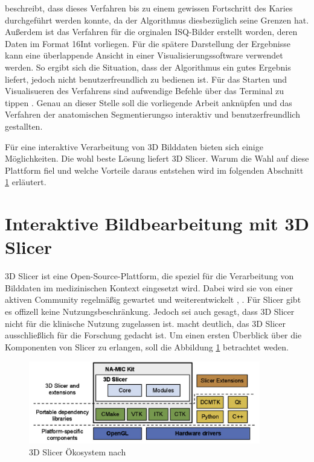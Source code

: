 \citet[S.~55]{hoffmann2020} beschreibt, dass dieses Verfahren bis zu einem
gewissen Fortschritt des Karies durchgeführt werden konnte, da der Algorithmus diesbezüglich
seine Grenzen hat. Außerdem ist das Verfahren für die orginalen \ac{ISQ}-Bilder erstellt
worden, deren Daten im Format \ac{16Int} vorliegen. Für die spätere Darstellung
der Ergebnisse kann eine überlappende Ansicht in einer Visualisierungssoftware
verwendet werden. So ergibt sich die Situation, dass der Algorithmus ein gutes
Ergebnis liefert, jedoch nicht benutzerfreundlich zu bedienen ist. Für das
Starten und Visualisueren des Verfahrens sind aufwendige Befehle über das
Terminal zu tippen \citep[vgl.][S.~53]{hoffmann2020}. Genau an dieser Stelle
soll die vorliegende Arbeit anknüpfen und das Verfahren der anatomischen
Segmentierungso interaktiv und benutzerfreundlich gestallten.

Für eine interaktive Verarbeitung von 3D Bilddaten bieten sich einige
Möglichkeiten. Die wohl beste Lösung liefert 3D Slicer. Warum die Wahl auf diese
Plattform fiel und welche Vorteile daraus entstehen wird im folgenden Abschnitt
\ref{sec:3d_slicer} erläutert.

\section{Interaktive Bildbearbeitung mit 3D Slicer}
\label{sec:3d_slicer} 3D Slicer ist eine Open-Source-Plattform, die speziel für die
Verarbeitung von Bilddaten im medizinischen Kontext eingesetzt wird. Dabei wird
sie von einer aktiven Community regelmäßig gewartet und weiterentwickelt \citep[vgl.][K.~1]{slicer2024},
\citep[vgl.][S.~3]{fedorov2012slicer}. Für Slicer gibt es offizell keine
Nutzungsbeschränkung. Jedoch sei auch gesagt, dass 3D Slicer nicht für die
klinische Nutzung zugelassen ist. \citet[S.~7]{fedorov2012slicer} macht deutlich,
das 3D Slicer ausschließlich für die Forschung gedacht ist. Um einen ersten
Überblick über die Komponenten von Slicer zu erlangen, soll die Abbildung \ref{fig:3d_slicer_oekosystem}
betrachtet weden.

\begin{figure}[h]
	\centering
	\includegraphics[width=0.9\textwidth]{img/3d_slicer_overview.jpg}
	\caption{3D Slicer Ökosystem nach \citet[S.~23]{fedorov2012slicer}}
	\label{fig:3d_slicer_oekosystem}
\end{figure}

